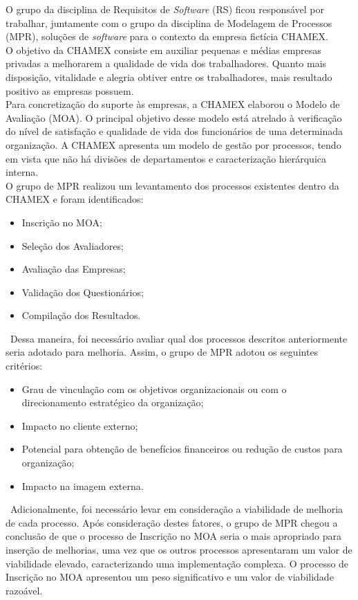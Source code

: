 O grupo da disciplina de Requisitos de \emph{Software} (RS) ficou responsável por trabalhar, juntamente com o grupo da disciplina de Modelagem de Processos (MPR), soluções de \emph{software} para o contexto da empresa fictícia CHAMEX.
\\ \indent O objetivo da CHAMEX consiste em auxiliar pequenas e médias empresas privadas a melhorarem a qualidade de vida dos trabalhadores. Quanto mais disposição, vitalidade e alegria obtiver entre os trabalhadores, mais resultado positivo as empresas possuem.
\\ \indent Para concretização do suporte às empresas, a CHAMEX elaborou o Modelo de Avaliação (MOA). O principal objetivo desse modelo está atrelado à verificação do nível de satisfação e qualidade de vida dos funcionários de uma determinada organização. A CHAMEX apresenta um modelo de gestão por processos, tendo em vista que não há divisões de departamentos e caracterização hierárquica interna.
\\ \indent O grupo de MPR realizou um levantamento dos processos existentes dentro da CHAMEX e foram identificados:
\begin{itemize}
	\item{Inscrição no MOA;}
	\item{Seleção dos Avaliadores;}
	\item{Avaliação das Empresas;}
	\item{Validação dos Questionários;}
	\item{Compilação dos Resultados.}
\end{itemize}
\ \indent Dessa maneira, foi necessário avaliar qual dos processos descritos anteriormente seria adotado para melhoria. Assim, o grupo de MPR adotou os seguintes critérios:
\begin{itemize}
	\item{Grau de vinculação com os objetivos organizacionais ou com o direcionamento estratégico da organização;}
	\item{Impacto no cliente externo;}
	\item{Potencial para obtenção de benefícios financeiros ou redução de custos para organização;}
	\item{Impacto na imagem externa.}
\end{itemize}
\ \indent Adicionalmente, foi necessário levar em consideração a viabilidade de melhoria de cada processo. Após consideração destes fatores, o grupo de MPR chegou a conclusão de que o processo de Inscrição no MOA seria o mais apropriado para inserção de melhorias, uma vez que os outros processos apresentaram um valor de viabilidade elevado, caracterizando uma implementação complexa. O processo de Inscrição no MOA apresentou um peso significativo e um valor de viabilidade razoável.